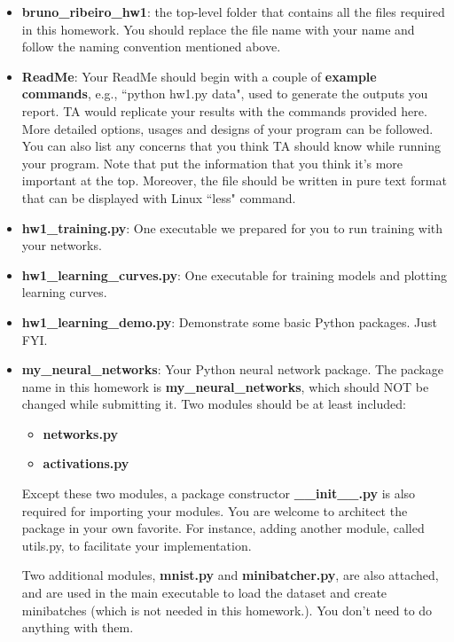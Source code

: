 \documentclass{article}
\newcommand{\homeworknumber}{1}
\begin{document}
\begin{itemize}
\item \textbf{bruno\_ribeiro\_hw\homeworknumber}: the top-level folder that contains all the files
          required in this homework. You should replace the file name with your
          name and follow the naming convention mentioned above.

\item \textbf{ReadMe}: Your ReadMe should begin with a couple of \textbf{example commands}, e.g., ``python hw\homeworknumber.py data", used to generate the outputs you report. TA would replicate your results with the commands
          provided here. More detailed options, usages and designs of your
          program can be followed. You can also list any concerns that you
          think TA should know while running your program. Note that put the
          information that you think it's more important at the top. Moreover,
          the file should be written in pure text format that can be displayed
          with Linux ``less" command.

\item \textbf{hw\homeworknumber\_training.py}: One executable we prepared for you to run
          training with your networks.

\item \textbf{hw\homeworknumber\_learning\_curves.py}: One executable for training models
          and plotting learning curves.

\item \textbf{hw\homeworknumber\_learning\_demo.py}: Demonstrate some basic Python packages. Just FYI.

\item \textbf{my\_neural\_networks}: Your Python neural network package.
          The package name in this homework is \textbf{my\_neural\_networks},
          which should NOT be changed while submitting it. Two modules should
          be at least included:
\begin{itemize}
\item \textbf{networks.py}
\item \textbf{activations.py}
\end{itemize}
Except these two modules, a package constructor \textbf{\_\_init\_\_.py} is also required for importing your modules. You are welcome to architect the package in your own favorite. For instance, adding another module, called utils.py, to facilitate your implementation.

Two additional modules, \textbf{mnist.py} and \textbf{minibatcher.py}, are also attached, and are used in the main executable to load the dataset and create minibatches (which is not needed in this homework.). You don't need to do anything with them.


\end{itemize}
\end{document}
